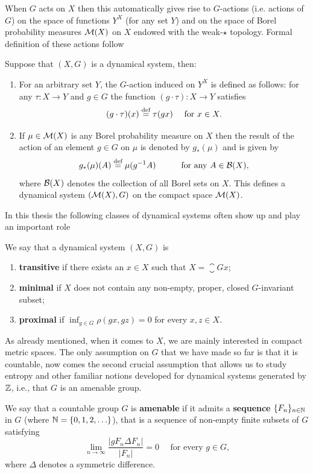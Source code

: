 When $G$ acts on $X$ then this automatically gives rise to $G$-actions (i.e. actions of  $G$) on the space of functions $Y^X$ (for any set $Y$) and on the space of Borel probability measures $\operatorname{\mathcal{M}}(X)$ on $X$ endowed with the weak-$\star$ topology. Formal definition of these actions follow
\begin{defn}\label{def:induced_group_action}
Suppose that $(X,G)$ is a dynamical system, then:
\begin{enumerate}
\item For an arbitrary set $Y$, the $G$-action induced on $Y^X$ is defined as follows: for any $\tau: X\to Y$ and $g\in G$ the function $(g\cdot \tau):X\to Y$  satisfies
\[
(g\cdot\tau)(x) \stackrel{\textup{def}}{=} \tau(g x) \quad\text{ for } x\in X.
\]
\item If $\mu \in \operatorname{\mathcal{M}}(X)$ is any Borel probability measure on $X$ then the result of the action of an element $g\in G$ on $\mu$ is denoted by $g_{*}(\mu)$ and is given by
\[
g_*(\mu)(A)\stackrel{\textup{def}}{=}\mu(g^{-1} A)~~~~~~~~~\mbox{for any $A\in \mathcal{B}(X)$,}
\]
where $\mathcal{B}(X)$ denotes the collection of all Borel sets on $X$. This defines a dynamical system $(\operatorname{\mathcal{M}}(X),G)$ on the compact space $\operatorname{\mathcal{M}}(X)$.
\end{enumerate}
\end{defn}

\noindent
In this thesis the following classes of dynamical systems often show up and play an important role
\begin{defn}
We say that a dynamical system $(X,G)$ is
\begin{enumerate}
\item {\bf transitive} if there exists an $x\in X$ such that $X=\closure{Gx}$;
\item {\bf minimal} if $X$ does not contain any non-empty, proper, closed $G$-invariant subset;
\item {\bf proximal} if $\displaystyle \inf_{g\in G}\rho(gx,gz)=0$ for every $x,z\in X$.
\end{enumerate}
\end{defn}

\noindent
As already mentioned, when it comes to $X$, we are mainly interested in compact metric spaces.
%
The only assumption on $G$ that we have made so far is that it is countable, now comes the second crucial assumption that allows us to study entropy and other familiar notions developed for dynamical systems generated by $\mathbb{Z}$, i.e., that $G$ is an amenable group.

\begin{defn}[Amenability]
We say that a countable group $G$ is {\bf amenable} if it admits  a {\bf \Folner sequence} $\{F_n\}_{n\in\mathbb{N}}$ in $G$ (where $\mathbb{N}=\{0,1,2,\ldots\}$), that is a sequence of non-empty finite subsets of $G$ satisfying 
\[
\lim_{n\to\infty}\frac{|gF_n\Delta F_n|}{|F_n|}= 0~~~~~~\mbox{for every $g\in G$,}
\]
where $\Delta$ denotes a symmetric difference.
\end{defn}

